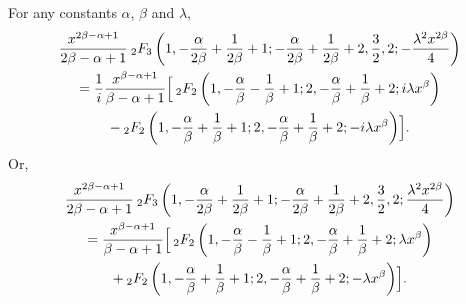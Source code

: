 \documentclass[smallextended]{svjour3}
\begin{document}
\begin{theorem}
For any constants $\alpha$, $\beta$ and $\lambda$,
\begin{multline}
\frac{x^{2\beta-\alpha+1}}{2\beta-\alpha+1}\hspace{.075cm} _{2}F_{3}\left(1,-\frac{\alpha}{2\beta}+\frac{1}{2\beta}+1;-\frac{\alpha}{2\beta}+\frac{1}{2\beta}+2,\frac{3}{2},2;-\frac{\lambda^2 x^{2\beta}}{4}\right)\\=
\frac{1}{i}\frac{x^{\beta-\alpha+1}}{\beta-\alpha+1}\Bigl[\hspace{.075cm}   _{2}F_{2}\left(1,-\frac{\alpha}{\beta}-\frac{1}{\beta}+1;2,-\frac{\alpha}{\beta}+\frac{1}{\beta}+2;i\lambda x^\beta\right)
\\  -\hspace{.075cm}_{2}F_{2}\left(1,-\frac{\alpha}{\beta}+\frac{1}{\beta}+1;2,-\frac{\alpha}{\beta}+\frac{1}{\beta}+2;-i\lambda x^\beta\right)\Bigr].
\label{Thm8-1}
\end{multline}
Or, \begin{multline}
\frac{x^{2\beta-\alpha+1}}{2\beta-\alpha+1}\hspace{.075cm} _{2}F_{3}\left(1,-\frac{\alpha}{2\beta}+\frac{1}{2\beta}+1;-\frac{\alpha}{2\beta}+\frac{1}{2\beta}+2,\frac{3}{2},2;\frac{\lambda^2 x^{2\beta}}{4}\right)\\=
\frac{x^{\beta-\alpha+1}}{\beta-\alpha+1}\Bigl[\hspace{.075cm}   _{2}F_{2}\left(1,-\frac{\alpha}{\beta}-\frac{1}{\beta}+1;2,-\frac{\alpha}{\beta}+\frac{1}{\beta}+2;\lambda x^\beta\right)
\\  +\hspace{.075cm}_{2}F_{2}\left(1,-\frac{\alpha}{\beta}+\frac{1}{\beta}+1;2,-\frac{\alpha}{\beta}+\frac{1}{\beta}+2;-\lambda x^\beta\right)\Bigr].
\label{Thm8-2}
\end{multline}
\label{Thm8}
\end{theorem}
\end{document}
